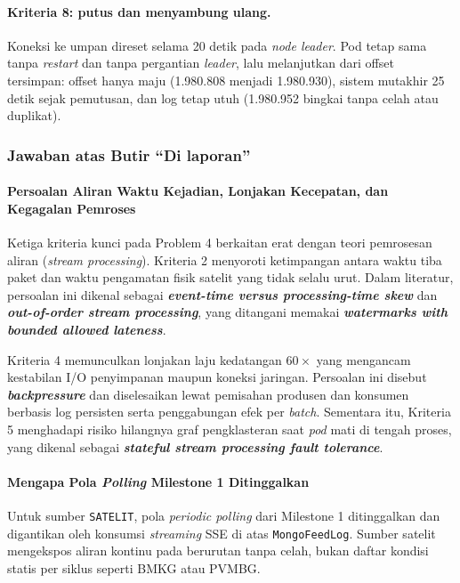 \paragraph*{Kriteria 8: putus dan menyambung ulang.}
Koneksi ke umpan direset selama 20 detik pada \textit{node leader}. Pod tetap sama tanpa \textit{restart} dan tanpa pergantian \textit{leader}, lalu melanjutkan dari offset tersimpan: offset hanya maju (1.980.808 menjadi 1.980.930), sistem mutakhir 25 detik sejak pemutusan, dan log tetap utuh (1.980.952 bingkai tanpa celah atau duplikat).

\subsubsection{Jawaban atas Butir ``Di laporan''}

\paragraph*{Persoalan Aliran Waktu Kejadian, Lonjakan Kecepatan, dan Kegagalan Pemroses}
Ketiga kriteria kunci pada Problem 4 berkaitan erat dengan teori pemrosesan aliran (\textit{stream processing}). Kriteria 2 menyoroti ketimpangan antara waktu tiba paket dan waktu pengamatan fisik satelit yang tidak selalu urut. Dalam literatur, persoalan ini dikenal sebagai \textbf{\textit{event-time versus processing-time skew}} dan \textbf{\textit{out-of-order stream processing}}, yang ditangani memakai \textbf{\textit{watermarks with bounded allowed lateness}}.

Kriteria 4 memunculkan lonjakan laju kedatangan $60\times$ yang mengancam kestabilan I/O penyimpanan maupun koneksi jaringan. Persoalan ini disebut \textbf{\textit{backpressure}} dan diselesaikan lewat pemisahan produsen dan konsumen berbasis log persisten serta penggabungan efek per \textit{batch}. Sementara itu, Kriteria 5 menghadapi risiko hilangnya graf pengklasteran saat \textit{pod} mati di tengah proses, yang dikenal sebagai \textbf{\textit{stateful stream processing fault tolerance}}.

\paragraph*{Mengapa Pola \textit{Polling} Milestone 1 Ditinggalkan}
Untuk sumber \texttt{SATELIT}, pola \textit{periodic polling} dari Milestone 1 ditinggalkan dan digantikan oleh konsumsi \textit{streaming} SSE di atas \texttt{MongoFeedLog}. Sumber satelit mengekspos aliran kontinu pada  berurutan tanpa celah, bukan daftar kondisi statis per siklus seperti BMKG atau PVMBG.

